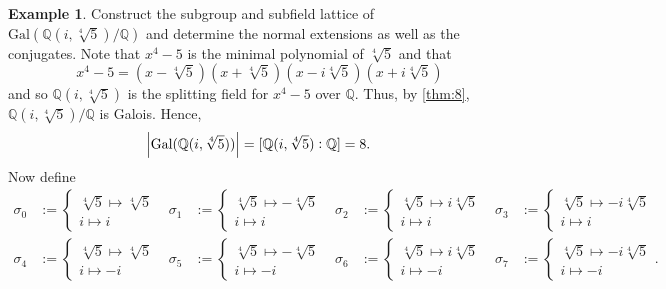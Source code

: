 \documentclass[leqno]{article}
\theoremstyle{definition}
\theoremstyle{remark}
\theoremstyle{definition}
\newtheorem{example}{Example}
\begin{document}
    \begin{example}
        Construct the subgroup and subfield lattice of $\text{Gal}(\mathbb{Q}(i,\sqrt[4]{5})/\mathbb{Q})$ and determine the normal extensions as well as the conjugates. Note that $x^4-5$ is the minimal polynomial of $\sqrt[4]{5}$ and that 
            \begin{equation*}
                x^4-5=(x-\sqrt[4]{5})(x+\sqrt[4]{5})(x-i\sqrt[4]{5})(x+i\sqrt[4]{5})
            \end{equation*}
        and so $\mathbb{Q}(i,\sqrt[4]{5})$ is the splitting field for $x^4-5$ over $\mathbb{Q}$. Thus, by \cref{thm:8}, $\mathbb{Q}(i,\sqrt[4]{5})/\mathbb{Q}$ is Galois. Hence,
            \begin{equation*}
                \abs{\text{Gal}(\mathbb{Q}(i,\sqrt[4]{5}))}=[\mathbb{Q}(i,\sqrt[4]{5}):\mathbb{Q}]=8.
            \end{equation*}
        Now define
            \begin{align*}
                \sigma_0&:=\begin{cases} \sqrt[4]{5}\mapsto\sqrt[4]{5} \\ i\mapsto i \end{cases} & \sigma_1&:=\begin{cases} \sqrt[4]{5}\mapsto-\sqrt[4]{5} \\ i\mapsto i\end{cases} & \sigma_2&:=\begin{cases} \sqrt[4]{5}\mapsto i\sqrt[4]{5} \\ i\mapsto i\end{cases} & \sigma_3&:=\begin{cases} \sqrt[4]{5}\mapsto -i\sqrt[4]{5} \\ i\mapsto i\end{cases} \\ \sigma_4&:=\begin{cases} \sqrt[4]{5}\mapsto\sqrt[4]{5} \\ i\mapsto-i\end{cases} & \sigma_5&:=\begin{cases} \sqrt[4]{5}\mapsto-\sqrt[4]{5} \\ i\mapsto-i\end{cases} & \sigma_6&:=\begin{cases} \sqrt[4]{5}\mapsto i\sqrt[4]{5} \\ i\mapsto-i\end{cases} & \sigma_7&:=\begin{cases} \sqrt[4]{5}\mapsto-i\sqrt[4]{5} \\ i\mapsto-i\end{cases}.

\end{align*}
\end{example}
\end{document}
